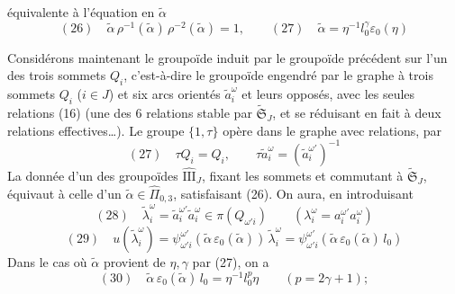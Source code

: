 \documentclass[11pt,a4paper]{article}
\begin{document}
équivalente à l'équation  \struck{\ill{}}  en $\tilde\alpha$
\[
(26)\quad \tilde\alpha\, \rho^{-1}(\tilde\alpha)\, \rho^{-2}(\tilde\alpha) = 1, \qquad
\boxed{(27)\quad \tilde\alpha = \eta^{-1} l_0^{\gamma} \varepsilon_0(\eta)}
\]

Considérons maintenant le groupoïde  induit par le groupoïde précédent  sur l'un des trois sommets $Q_i$, c'est-à-dire le groupoïde engendré par le graphe à trois sommets $Q_i$ ($i \in J$) et six arcs orientés $\tilde a_i^{\omega}$ et leurs opposés, avec les seules relations (16) (une des 6 relations stable par $\widetilde{\mathfrak{S}}_J$, et se réduisant en fait à deux relations effectives…). Le groupe $\{1, \tau\}$ opère dans le graphe avec relations, par
\[
(27)\quad \tau Q_i = Q_i, \qquad \tau \tilde a_i^{\omega} = (\tilde a_i^{\omega'})^{-1}
\]
La donnée d'un   des groupoïdes $\widehat{\mathrm{III}}_J$, fixant les sommets et commutant à $\widetilde{\mathfrak{S}}_J$, équivaut à celle d'un $\tilde\alpha \in \widehat{\Pi}_{0,3}$, \struck{\ill{}}  satisfaisant (26). On aura, en introduisant
\[
(28)\quad \tilde\lambda_i^{\omega} = \tilde a_i^{\omega'} \tilde a_i^{\omega} \in \pi(Q_{\omega' i})
\qquad (\lambda_i^{\omega} = a_i^{\omega'} a_i^{\omega})
\]
\[
(29)\quad u(\tilde\lambda_i^{\omega}) = \psi^{\omega'}_{\omega' i}(\tilde\alpha\, \varepsilon_0(\tilde\alpha))\, \tilde\lambda_i^{\omega}
= \psi^{\omega'}_{\omega' i}(\tilde\alpha\, \varepsilon_0(\tilde\alpha)\, l_0)
\]
Dans le cas où $\tilde\alpha$ provient de $\eta, \gamma$ par (27), on a
\[
(30)\quad \tilde\alpha\, \varepsilon_0(\tilde\alpha)\, l_0 = \eta^{-1} l_0^{p} \eta \qquad (p = 2\gamma+1) ;
\]
\end{document}
